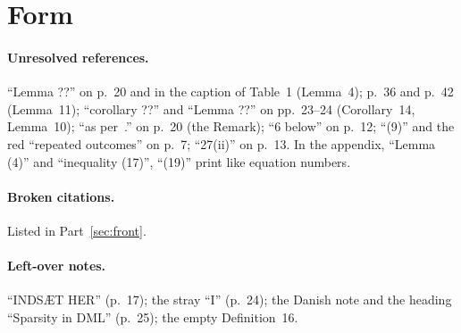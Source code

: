 \documentclass[11pt]{article}
\theoremstyle{plain}
\theoremstyle{remark}
\begin{document}
\section{Form}\label{sec:form}

\paragraph{Unresolved references.} ``Lemma ??'' on p.~20 and in the caption of
Table~1 (Lemma~4); p.~36 and p.~42 (Lemma~11); ``corollary ??'' and ``Lemma ??''
on pp.~23--24 (Corollary~14, Lemma~10); ``as per~.'' on p.~20 (the Remark); ``6
below'' on p.~12; ``(9)'' and the red ``repeated outcomes'' on p.~7; ``27(ii)''
on p.~13. In the appendix, ``Lemma (4)'' and ``inequality (17)'', ``(19)'' print
like equation numbers.

\paragraph{Broken citations.} Listed in Part~\ref{sec:front}.

\paragraph{Left-over notes.} ``INDSÆT HER'' (p.~17); the stray ``I'' (p.~24); the
Danish note and the heading ``Sparsity in DML'' (p.~25); the empty
Definition~16.
\end{document}
